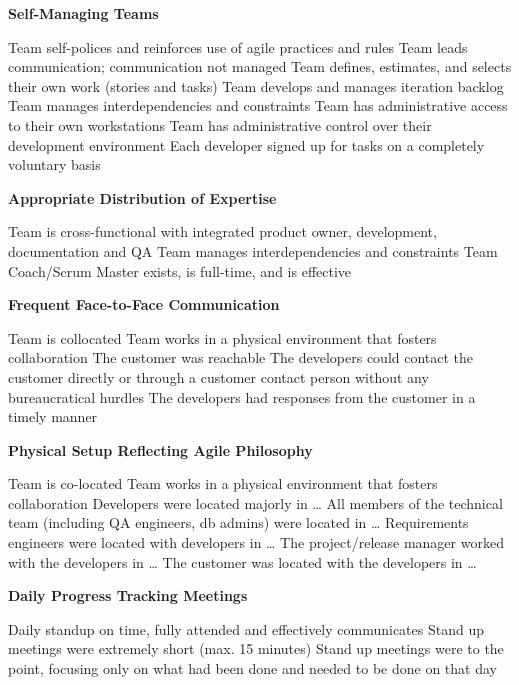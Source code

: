 \textbf{Self-Managing Teams}
\begin{itemize}
	\taa Team self-polices and reinforces use of agile practices and rules
	\taa Team leads communication; communication not managed
	\taa Team defines, estimates, and selects their own work (stories and tasks)
	\taa Team develops and manages iteration backlog
	\taa Team manages interdependencies and constraints
	\taa Team has administrative access to their own workstations 
	\taa Team has administrative control over their development environment
	\pam Each developer signed up for tasks on a completely voluntary basis
\end{itemize}

\textbf{Appropriate Distribution of Expertise}
\begin{itemize}
	\taa Team is cross-functional with integrated product owner, development, documentation and QA
	\taa Team manages interdependencies and constraints
	\taa Team Coach/Scrum Master exists, is full-time, and is effective
\end{itemize}

\textbf{Frequent Face-to-Face Communication}
\begin{itemize}
	\taa Team is collocated
	\taa Team works in a physical environment that fosters collaboration
	\pam The customer was reachable
	\pam The developers could contact the customer directly or through a customer contact person without any bureaucratical hurdles 
	\pam The developers had responses from the customer in a timely manner 
\end{itemize}

\textbf{Physical Setup Reflecting Agile Philosophy}
\begin{itemize}
	\taa Team is co-located
	\taa Team works in a physical environment that fosters collaboration
	\pam Developers were located majorly in \ldots
	\pam All members of the technical team (including QA engineers, db admins) were located in \ldots
	\pam Requirements engineers were located with developers in \ldots
	\pam The project/release manager worked with the developers in \ldots
	\pam The customer was located with the developers in \ldots
\end{itemize}

\textbf{Daily Progress Tracking Meetings}
\begin{itemize}
	\taa Daily standup on time, fully attended and effectively communicates
	\pam Stand up meetings were extremely short (max. 15 minutes) 
	\pam Stand up meetings were to the point, focusing only on what had been done and needed to be done on that day 
\end{itemize}

